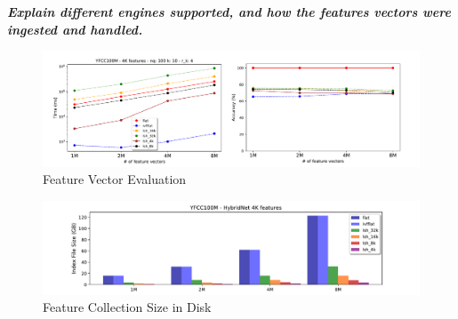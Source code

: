 

\textbf{\textit{Explain different engines supported, and how the features vectors
were ingested and handled.}}

\begin{figure}[]
\centering
\includegraphics[width=\textwidth]{figures/features_alternatives}
\caption{Feature Vector Evaluation}
\label{fig:features_eval}
\end{figure}

\begin{figure}[]
\centering
\includegraphics[width=\textwidth]{figures/features_disksize}
\caption{Feature Collection Size in Disk}
\label{fig:features_size_does_matter}
\end{figure}
